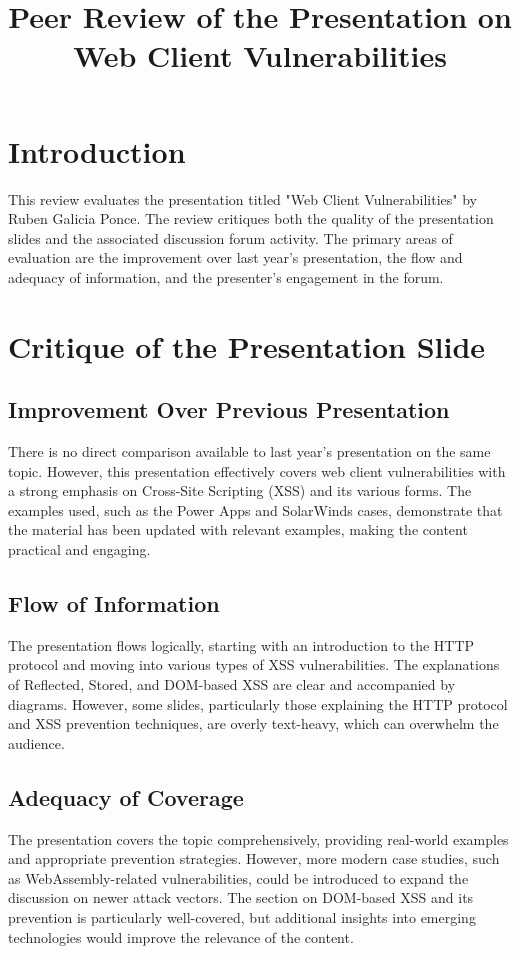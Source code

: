 \documentclass{article}
\title{Peer Review of the Presentation on Web Client Vulnerabilities}
\date{}
\begin{document}
\maketitle

\section{Introduction}
This review evaluates the presentation titled "Web Client Vulnerabilities" by Ruben Galicia Ponce. The review critiques both the quality of the presentation slides and the associated discussion forum activity. The primary areas of evaluation are the improvement over last year’s presentation, the flow and adequacy of information, and the presenter's engagement in the forum.

\section{Critique of the Presentation Slide }
\subsection{Improvement Over Previous Presentation}
There is no direct comparison available to last year’s presentation on the same topic. However, this presentation effectively covers web client vulnerabilities with a strong emphasis on Cross-Site Scripting (XSS) and its various forms. The examples used, such as the Power Apps and SolarWinds cases, demonstrate that the material has been updated with relevant examples, making the content practical and engaging.

\subsection{Flow of Information}
The presentation flows logically, starting with an introduction to the HTTP protocol and moving into various types of XSS vulnerabilities. The explanations of Reflected, Stored, and DOM-based XSS are clear and accompanied by diagrams. However, some slides, particularly those explaining the HTTP protocol and XSS prevention techniques, are overly text-heavy, which can overwhelm the audience.

\subsection{Adequacy of Coverage}
The presentation covers the topic comprehensively, providing real-world examples and appropriate prevention strategies. However, more modern case studies, such as WebAssembly-related vulnerabilities, could be introduced to expand the discussion on newer attack vectors. The section on DOM-based XSS and its prevention is particularly well-covered, but additional insights into emerging technologies would improve the relevance of the content.
\end{document}
